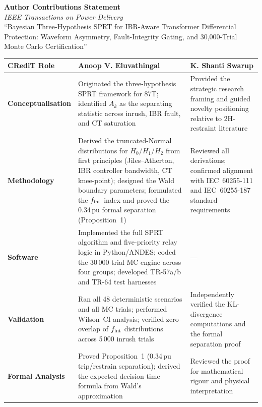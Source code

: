 \documentclass[11pt,a4paper]{article}
\begin{document}
\begin{center}
{\large\bfseries Author Contributions Statement}\\[6pt]
\textit{IEEE Transactions on Power Delivery}\\[4pt]
``Bayesian Three-Hypothesis SPRT for IBR-Aware Transformer Differential
Protection: Waveform Asymmetry, Fault-Integrity Gating, and 30,000-Trial
Monte Carlo Certification''
\end{center}

\bigskip

\noindent\begin{tabular}{@{} >{\bfseries}p{4.0cm} p{5.1cm} p{5.1cm} @{}}
\toprule
CRediT Role &
\textbf{Anoop V. Eluvathingal} &
\textbf{K. Shanti Swarup} \\
\midrule

Conceptualisation &
Originated the three-hypothesis SPRT framework for 87T; identified
$A_k$ as the separating statistic across inrush, IBR fault, and CT
saturation &
Provided the strategic research framing and guided novelty positioning
relative to 2H-restraint literature \\[5pt]

Methodology &
Derived the truncated-Normal distributions for $H_0$/$H_1$/$H_2$ from
first principles (Jiles--Atherton, IBR controller bandwidth, CT knee-point);
designed the Wald boundary parameters; formulated the $f_{\rm int}$ index
and proved the 0.34\,pu formal separation (Proposition~1) &
Reviewed all derivations; confirmed alignment with IEC~60255-111 and
IEC~60255-187 standard requirements \\[5pt]

Software &
Implemented the full SPRT algorithm and five-priority relay logic in
Python/ANDES; coded the 30\,000-trial MC engine across four groups;
developed TR-57a/b and TR-64 test harnesses &
--- \\[5pt]

Validation &
Ran all 48 deterministic scenarios and all MC trials; performed Wilson~CI
analysis; verified zero-overlap of $f_{\rm int}$ distributions across
5\,000 inrush trials &
Independently verified the KL-divergence computations and the formal
separation proof \\[5pt]

Formal Analysis &
Proved Proposition~1 (0.34\,pu trip/restrain separation); derived the
expected decision time formula from Wald's approximation &
Reviewed the proof for mathematical rigour and physical interpretation \\[5pt]


\end{tabular}
\end{document}
